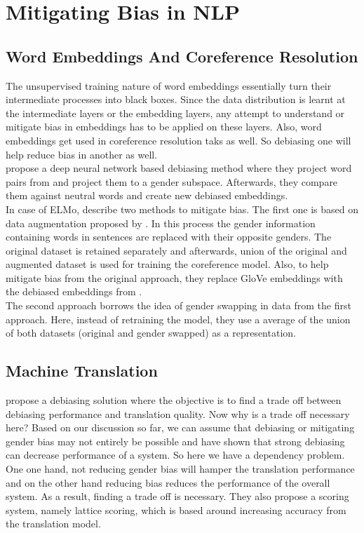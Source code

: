 \documentclass{article}
\begin{document}
\section*{Mitigating Bias in NLP}

\subsection*{Word Embeddings And Coreference Resolution}
The unsupervised training nature of word embeddings essentially turn their intermediate processes into black boxes. Since the data distribution is learnt at the intermediate layers or the embedding layers, any attempt to understand or mitigate bias in embeddings has to be applied on these layers. Also, word embeddings get used in coreference resolution taks as well. So debiasing one will help reduce bias in another as well. \\


\noindent
\cite{prost2019debiasing} propose a deep neural network based debiasing method where they project word pairs from \cite{bolukbasi2016man} and project them to a gender subspace. Afterwards, they compare them against neutral words and create new debiased embeddings. \\

\noindent
In case of ELMo, \cite{zhao2019gender} describe two methods to mitigate bias. The first one is based on data augmentation proposed by \cite{zhao2018learning}. In this process the gender information containing words in sentences are replaced with their opposite genders. The original dataset is retained separately and afterwards, union of the original and augmented dataset is used for training the coreference model. Also, to help mitigate bias from the original approach, they replace GloVe embeddings with the debiased embeddings from \cite{bolukbasi2016man}. \\

\noindent
The second approach borrows the idea of gender swapping in data from the first approach. Here, instead of retraining the model, they use a average of the union of both datasets (original and gender swapped) as a representation. 


\subsection*{Machine Translation}
\cite{saunders-byrne-2020-reducing} propose a debiasing solution where the objective is to find a trade off between debiasing performance and translation quality. Now why is a trade off necessary here? Based on our discussion so far, we can assume that debiasing or mitigating gender bias may not entirely be possible and \cite{zhao2019gender} have shown that strong debiasing can decrease performance of a system. So here we have a dependency problem. One one hand, not reducing gender bias will hamper the translation performance and on the other hand reducing bias reduces the performance of the overall system. As a result, finding a trade off is necessary. They also propose a scoring system, namely lattice scoring, which is based around increasing accuracy from the translation model. 
\end{document}
